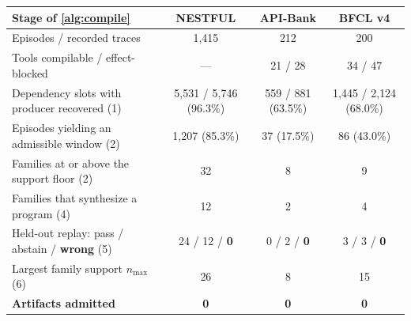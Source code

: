 \begin{tabular}{@{}lccc@{}}
\toprule
Stage of \cref{alg:compile} & NESTFUL & API-Bank & BFCL v4 \\
\midrule
Episodes / recorded traces                          & 1{,}415 & 212 & 200 \\
Tools compilable / effect-blocked                   & ---     & 21 / 28 & 34 / 47 \\
\addlinespace[1pt]
Dependency slots with producer recovered (1)        & 5{,}531 / 5{,}746 (96.3\%) & 559 / 881 (63.5\%) & 1{,}445 / 2{,}124 (68.0\%) \\
Episodes yielding an admissible window (2)          & 1{,}207 (85.3\%) & 37 (17.5\%) & 86 (43.0\%) \\
Families at or above the support floor (2)          & 32 & 8 & 9 \\
Families that synthesize a program (4)              & 12 & 2 & 4 \\
Held-out replay: pass / abstain / \textbf{wrong} (5)& 24 / 12 / \textbf{0} & 0 / 2 / \textbf{0} & 3 / 3 / \textbf{0} \\
\addlinespace[1pt]
Largest family support $n_{\max}$ (6)               & 26 & 8 & 15 \\
\textbf{Artifacts admitted}                         & \textbf{0} & \textbf{0} & \textbf{0} \\
\bottomrule
\end{tabular}

